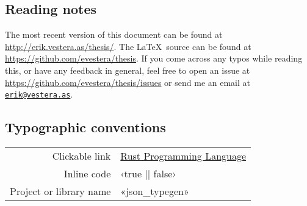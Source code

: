 
\vspace*{2cm}

\begin{center}

\section*{\hfil Reading notes \hfil}

The most recent version of this document can be found at \url{http://erik.vestera.as/thesis/}. The \LaTeX\ source can be found at \url{https://github.com/evestera/thesis}. If you come across any typos while reading this, or have any feedback in general, feel free to open an issue at \url{https://github.com/evestera/thesis/issues} or send me an email at \href{mailto:erik@vestera.as}{\nolinkurl{erik@vestera.as}}.

\subsection*{\hfil Typographic conventions \hfil}

\begin{tabular}{ r l }
Clickable link & \href{https://www.rust-lang.org/}{Rust Programming Language} \\
Inline code & ‹true || false› \\
Project or library name & «json_typegen» \\
\end{tabular}

\end{center}
